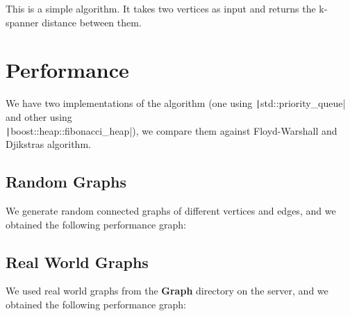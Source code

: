 \documentclass[12pt, a4paper]{article}
\newcommand{\code}[1]{\texttt|#1|}
\begin{document}
    This is a simple algorithm. It takes two vertices as input and returns the k-spanner distance between them.

    \section{Performance}

    We have two implementations of the algorithm (one using \code{std::priority_queue} and other using \\
    \code{boost::heap::fibonacci_heap}), we compare them against Floyd-Warshall and Djikstras algorithm.

    \subsection{Random Graphs}

    We generate random connected graphs of different vertices and edges, and we obtained the following performance graph:

    \subsection{Real World Graphs}

    We used real world graphs from the \textbf{Graph} directory on the server, and we obtained the following performance graph:

    \printbibliography
\end{document}
